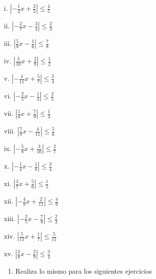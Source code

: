 \documentclass[]{book}
\providecommand{\tightlist}{%
  \setlength{\itemsep}{0pt}\setlength{\parskip}{0pt}}
\begin{document}
\begin{multicols}{2}
    i. $|-\frac{1}{3}x+\frac{2}{5}| \leq \frac{4}{5}$
    
    ii. $|-\frac{2}{7}x-\frac{3}{4}| \leq \frac{2}{3}$
    
    iii. $|\frac{5}{8}x-\frac{1}{6}| \leq \frac{7}{8}$
    
    iv. $|\frac{3}{10}x+\frac{2}{9}| \leq \frac{1}{2}$
    
    v. $|-\frac{4}{11}x+\frac{5}{7}| \leq \frac{3}{4}$
    
    vi. $|-\frac{2}{5}x-\frac{1}{3}| \leq \frac{2}{5}$
    
    vii. $|\frac{1}{6}x+\frac{7}{9}| \leq \frac{1}{3}$
    
    viii. $|\frac{7}{9}x-\frac{4}{11}| \leq \frac{5}{6}$
    
    ix. $|-\frac{5}{8}x+\frac{3}{10}| \leq \frac{2}{7}$
    
    x. $|-\frac{1}{4}x-\frac{1}{8}| \leq \frac{3}{4}$
    
    xi. $|\frac{3}{7}x+\frac{5}{6}| \leq \frac{1}{5}$
    
    xii. $|-\frac{4}{9}x+\frac{2}{11}| \leq \frac{4}{9}$
    
    xiii. $|-\frac{2}{5}x-\frac{7}{8}| \leq \frac{2}{3}$
    
    xiv. $|\frac{5}{11}x+\frac{1}{7}| \leq \frac{5}{11}$
    
    xv. $|\frac{3}{8}x-\frac{2}{9}| \leq \frac{3}{4}$
\end{multicols}

\begin{enumerate}
\def\labelenumi{\arabic{enumi}.}
\setcounter{enumi}{1}
\tightlist
\item
  Realiza lo mismo para los siguientes ejercicios
\end{enumerate}
\end{document}
